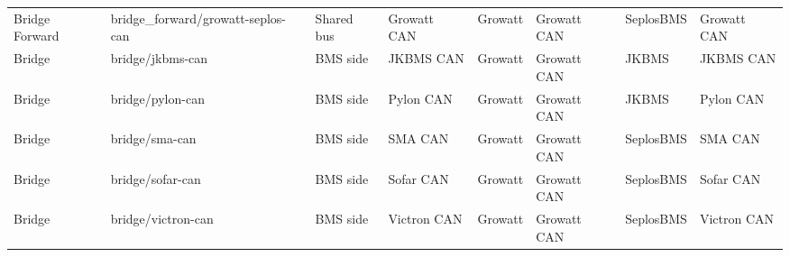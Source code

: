 \documentclass[11pt,a4paper]{article}
\begin{document}
\begin{landscape}
\begin{longtable}{@{}L{1.6cm}L{3.6cm}L{2.2cm}L{3.0cm}L{2.0cm}L{2.8cm}L{2.0cm}L{3.0cm}@{}}
Bridge Forward & bridge\_forward/growatt-seplos-can & Shared bus & Growatt CAN & Growatt & Growatt CAN & SeplosBMS & Growatt CAN \\
Bridge & bridge/jkbms-can & BMS side & JKBMS CAN & Growatt & Growatt CAN & JKBMS & JKBMS CAN \\
Bridge & bridge/pylon-can & BMS side & Pylon CAN & Growatt & Growatt CAN & JKBMS & Pylon CAN \\
Bridge & bridge/sma-can & BMS side & SMA CAN & Growatt & Growatt CAN & SeplosBMS & SMA CAN \\
Bridge & bridge/sofar-can & BMS side & Sofar CAN & Growatt & Growatt CAN & SeplosBMS & Sofar CAN \\
Bridge & bridge/victron-can & BMS side & Victron CAN & Growatt & Growatt CAN & SeplosBMS & Victron CAN \\
\bottomrule
\end{longtable}
\endgroup
\end{landscape}
\end{document}
